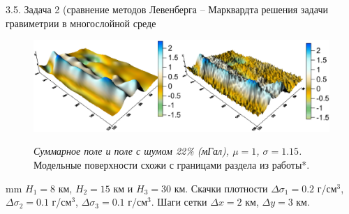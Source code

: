 \documentclass[10pt,pdf, mathserif, hyperref={unicode}]{beamer}
\begin{document}
\begin{frame}{3.5. Задача 2 \small (сравнение методов Левенберга -- Марквардта решения задачи гравиметрии в многослойной среде}
	\begin{figure}
		\centering
		\includegraphics[height=0.3\textheight]{fields}
		
		\centering\textit{Суммарное поле и поле с шумом 22\% (мГал), $\mu=1$, $\sigma=1.15$.}
\flushleft
Модельные поверхности схожи с границами раздела из работы*.
%		
	\end{figure}
%	
	 mm
	$H_1=8$ км, $H_2=15$ км и $H_3=30$ км. Скачки плотности $\Delta\sigma_1=0.2$ г/см$^3$, $\Delta\sigma_2=0.1$ г/см$^3$, $\Delta\sigma_3=0.1$ г/см$^3$. Шаги сетки $\Delta x=2$ км, $\Delta y=3$ км.

	\let\thefootnote\relax\let\thefootnote\relax{}

\end{frame}
\end{document}
